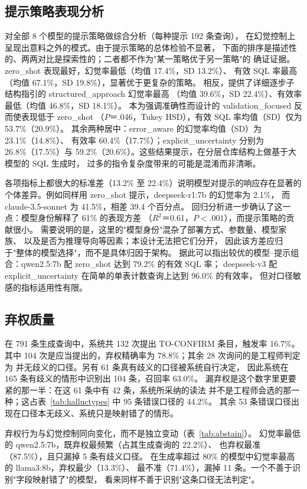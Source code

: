 \documentclass[11pt,a4paper]{article}
\begin{document}
\subsection{提示策略表现分析}
对全部 8 个模型的提示策略做综合分析（每种提示 192 条查询），
在幻觉控制上呈现出意料之外的模式。由于提示策略的总体检验不显著，
下面的排序是描述性的、两两对比是探索性的；二者都不作为"某一策略优于另一策略"的
确证证据。zero\_shot 表现最好，幻觉率最低（均值 17.4\%，SD 13.2\%）、
有效 SQL 率最高（均值 67.1\%，SD 19.8\%），显著优于更复杂的策略。
相反，提供了详细逐步子结构指引的 structured\_approach 幻觉率最高
（均值 39.6\%，SD 22.4\%）、有效率最低（均值 46.8\%，SD 18.1\%）。
本为强调准确性而设计的 validation\_focused 反而使表现低于 zero\_shot
（$P$＝.046，Tukey HSD），有效 SQL 率均值（SD）仅为 53.7\%（20.9\%）。
其余两种居中：error\_aware 的幻觉率均值（SD）为 23.1\%（14.8\%）、
有效率 60.4\%（17.7\%）；explicit\_uncertainty 分别为 26.8\%（17.5\%）与
59.2\%（20.6\%）。这些结果提示，在分层仓库结构上做基于大模型的 SQL 生成时，
过多的指令复杂度带来的可能是混淆而非清晰。

各项指标上都很大的标准差（13.2\% 至 22.4\%）说明模型对提示的响应存在显著的
个体差异。例如同样用 zero\_shot 提示，deepseek-r1:7b 的幻觉率为 2.1\%，
而 claude-3.5-sonnet 为 41.5\%，相差 39.4 个百分点。
回归分析进一步确认了这一点：模型身份解释了 61\% 的表现方差
（$R^2$＝0.61，$P<.001$），而提示策略的贡献很小。
需要说明的是，这里的"模型身份"混杂了部署方式、参数量、模型家族、
以及是否为推理导向等因素；本设计无法把它们分开，
因此该方差应归于"整体的模型选择"，而不是具体归因于架构。
据此可以指出较优的模型--提示组合：qwen2.5:7b 配 zero\_shot 达到 79.2\% 的有效 SQL 率；
deepseek-v3 配 explicit\_uncertainty 在简单的单表计数查询上达到 96.0\% 的有效率，
但对口径敏感的指标适用性有限。

\subsection{弃权质量}\label{sec:cn-abst}
在 791 条生成查询中，系统共 132 次提出 TO-CONFIRM 条目，触发率 16.7\%。
其中 104 次是应当提出的，弃权精确率为 78.8\%；其余 28 次询问的是工程师判定为
并无歧义的口径。另有 61 条真有歧义的口径被系统自行决定，
因此系统在 165 条有歧义的情形中识别出 104 条，召回率 63.0\%。
漏弃权是这个数字里更要紧的那一半：在这 61 条中有 42 条，系统所采纳的读法
并不是工程师会选的那一种；这占表~\ref{tab:halluctypes} 中 95 条错误口径的 44.2\%。
其余 53 条错误口径出现在口径本无歧义、系统只是映射错了的情形。

弃权行为与幻觉控制同向变化，而不是独立变动（表~\ref{tab:abstain}）。
幻觉率最低的 qwen2.5:7b，既弃权最频繁（占其生成查询的 22.2\%）、
也弃权最准（87.5\%），且只漏掉 5 条有歧义口径。
在生成率超过 80\% 的模型中幻觉率最高的 llama3:8b，弃权最少（13.3\%）、
最不准（71.4\%），漏掉 11 条。一个不善于识别"字段映射错了"的模型，
看来同样不善于识别"这条口径无法判定"。
\end{document}
